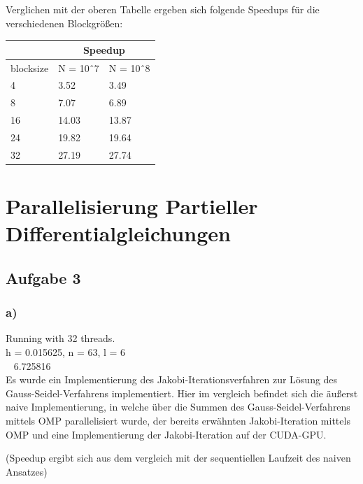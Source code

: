 \documentclass{report}
\begin{document}
Verglichen mit der oberen Tabelle ergeben sich folgende Speedups für die verschiedenen Blockgrößen: 
\begin{center}
	\begin{tabular}{l|l|l|}
		\cline{2-3}
		& \multicolumn{2}{c|}{Speedup} \\ \hline
		\multicolumn{1}{|l|}{blocksize} & N = 10ˆ7      & N = 10ˆ8     \\ \hline
		\multicolumn{1}{|l|}{4}         & 3.52          & 3.49         \\ \hline
		\multicolumn{1}{|l|}{8}         & 7.07          &       6.89       \\ \hline
		\multicolumn{1}{|l|}{16}        & 14.03         &       13.87       \\ \hline
		\multicolumn{1}{|l|}{24}        & 19.82         &     19.64         \\ \hline
		\multicolumn{1}{|l|}{32}        & 27.19         & 27.74        \\ \hline
	\end{tabular}
\end{center}
\section{Parallelisierung Partieller Differentialgleichungen}
\subsection{Aufgabe 3}

\subsubsection{a)}

Running with 32 threads.\\
h = 0.015625, n = 63, l = 6\\
~ 6.725816\\

Es wurde ein Implementierung des Jakobi-Iterationsverfahren zur Lösung des Gauss-Seidel-Verfahrens implementiert.
Hier im vergleich befindet sich die äußerst naive Implementierung, in welche über die Summen des Gauss-Seidel-Verfahrens mittels OMP parallelisiert wurde,
der bereits erwähnten Jakobi-Iteration mittels OMP und eine Implementierung der Jakobi-Iteration auf der CUDA-GPU.

(Speedup ergibt sich aus dem vergleich mit der sequentiellen Laufzeit des naiven Ansatzes)
\end{document}
